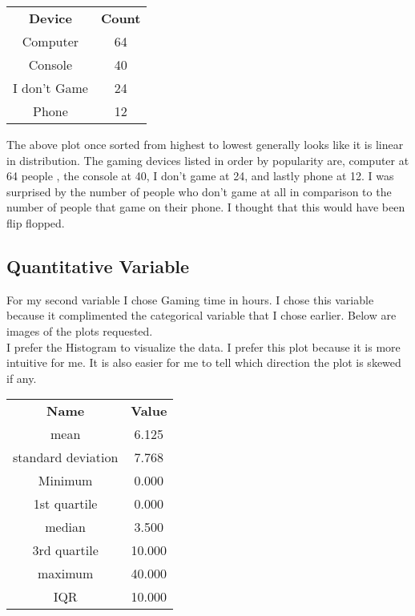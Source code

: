 \documentclass[letterpaper, onecolumn,10pt]{IEEEtran}
\begin{document}
                \begin{table}[H]
                    \begin{tabular}{|c|c|}
                        \textbf{Device} & \textbf{Count}\\
                        Computer & 64\\
                        Console & 40\\
                        I don't Game & 24\\
                        Phone & 12\\
                    \end{tabular}
                \end{table}
                The above plot once sorted from highest to lowest generally looks like it is linear in distribution. The gaming devices listed in order by popularity are, computer at 64 people , the console at 40, I don't game at 24, and lastly phone at 12. I was surprised by the number of people who don't game at all in comparison to the number of people that game on their phone. I thought that this would have been flip flopped.\\
                
            \subsection{Quantitative Variable}
                For my second variable I chose Gaming time in hours. I chose this variable because it complimented the categorical variable that I chose earlier. Below are images of the plots requested.\\
                
                
                
                I prefer the Histogram to visualize the data. I prefer this plot because it is more intuitive for me. It is also easier for me to tell which direction the plot is skewed if any. 
                
            
            \begin{table}[H]
                \begin{tabular}{|c|c|}
                    \textbf{Name} & \textbf{Value}\\
                    mean & 6.125\\
                    standard deviation & 7.768 \\
                    Minimum & 0.000\\
                    1st quartile & 0.000\\
                    median & 3.500\\
                    3rd quartile & 10.000\\
                    maximum & 40.000\\
                    IQR & 10.000\\
                \end{tabular}
            \end{table}
            
\end{document}

